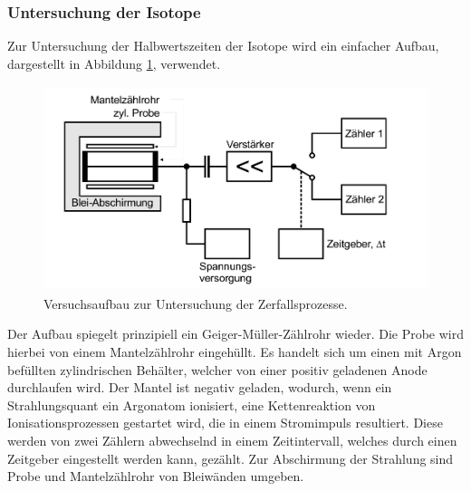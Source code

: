 \subsubsection{Untersuchung der Isotope}
Zur Untersuchung der Halbwertszeiten der Isotope wird ein einfacher Aufbau, dargestellt in Abbildung \ref{abb:2}, verwendet.
\begin{figure}[H]
  \centering
  \includegraphics[height=6cm]{ressources/aufbau.png}
  \caption{Versuchsaufbau zur Untersuchung der Zerfallsprozesse. \cite{skript}}
  \label{abb:2}
\end{figure}
Der Aufbau spiegelt prinzipiell ein Geiger-Müller-Zählrohr wieder.
Die Probe wird hierbei von einem Mantelzählrohr eingehüllt.
Es handelt sich um einen mit Argon befüllten zylindrischen Behälter, welcher von einer positiv geladenen Anode durchlaufen wird.
Der Mantel ist negativ geladen, wodurch, wenn ein Strahlungsquant ein Argonatom ionisiert, eine Kettenreaktion von Ionisationsprozessen gestartet wird, die in einem Stromimpuls resultiert.
Diese werden von zwei Zählern abwechselnd in einem Zeitintervall, welches durch einen Zeitgeber eingestellt werden kann, gezählt.
Zur Abschirmung der Strahlung sind Probe und Mantelzählrohr von Bleiwänden umgeben.
